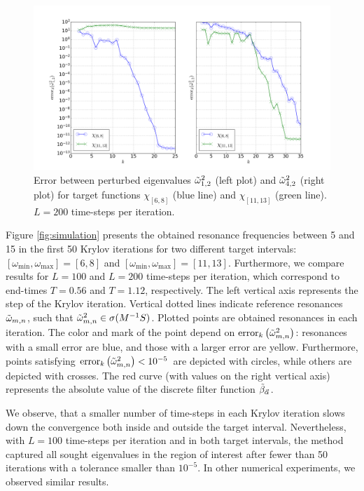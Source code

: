 \documentclass[a4paper,11pt,bibliography=totoc,listof=totoc,headinclude=true,cleardoublepage=empty,oneside]{scrbook}
\newcommand{\dffv}{\Tilde{\beta}_{\Vec{\alpha}}}
\begin{document}
\begin{figure}[h!]
    \centering
    \includegraphics[width=1\linewidth]{latex//images//simulation/Figure_1.png}
    \caption{Error between perturbed eigenvalues $\Tilde{\omega}_{1,2}^2$ (left plot) and $\Tilde{\omega}_{4,2}^2$ (right plot) for target functions $\chi_{[6,8]}$ (blue line) and $\chi_{[11,13]}$ (green line). $L=200$ time-steps per iteration.}
    \label{fig:errors plot}
\end{figure}

Figure \ref{fig:simulation} presents the obtained resonance frequencies between 5 and 15 in the first 50 Krylov iterations for two different target intervals: $\left[\omega_{\min}, \omega_{\max}\right] = [6, 8]$ and $\left[\omega_{\min}, \omega_{\max}\right] = [11, 13]$. Furthermore, we compare results for $L=100$ and $L=200$ time-steps per iteration, which correspond to end-times $T=0.56$ and $T=1.12$, respectively. The left vertical axis represents the step of the Krylov iteration. Vertical dotted lines indicate reference resonances $\Tilde{\omega}_{m,n}$, such that $\Tilde{\omega}_{m,n}^2 \in \sigma(M^{-1}S)$. Plotted points are obtained resonances in each iteration. The color and mark of the point depend on $\mathrm{error}_{k}\left(\Tilde{\omega}_{m,n}^2\right)$: resonances with a small error are blue, and those with a larger error are yellow. Furthermore, points satisfying $\mathrm{error}_{k}\left(\Tilde{\omega}_{m,n}^2\right) < 10^{-5}$ are depicted with circles, while others are depicted with crosses. The red curve (with values on the right vertical axis) represents the absolute value of the discrete filter function $\dffv$. 

We observe, that a smaller number of time-steps in each Krylov iteration slows down the convergence both inside and outside the target interval. Nevertheless, with $L=100$ time-steps per iteration and in both target intervals, the method captured all sought eigenvalues in the region of interest after fewer than 50 iterations with a tolerance smaller than $10^{-5}$. In other numerical experiments, we observed similar results.
\end{document}

